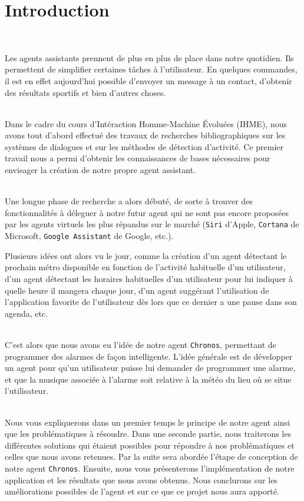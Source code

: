 \chapter*{Introduction}
\thispagestyle{plain}
~\\[1cm]
{ \large

Les agents assistants prennent de plus en plus de place dans notre quotidien.  Ils permettent de simplifier certaines tâches à l'utilisateur. En quelques  commandes, il est en effet aujourd'hui possible d'envoyer un message à un contact, d'obtenir des résultats sportifs et bien d'autres choses.

~\\\indent
Dans le cadre du cours d'\textsf{Intéraction Homme-Machine \'Evoluées} (\textsf{IHME}), nous avons tout d'abord effectué des travaux de recherches bibliographiques sur les systèmes de dialogues et sur les méthodes de détection d'activité. Ce premier  travail nous a permi d'obtenir les connaissances de bases nécessaires pour envisager la création de notre propre agent assistant.

~\\\indent
Une longue phase de recherche a alors débuté, de sorte à trouver des fonctionnalités à déleguer à notre futur agent qui ne sont pas encore proposées par les agents virtuels les plus répandus sur le marché (\og \texttt{Siri} \fg{} d'Apple, \og \texttt{Cortana} \fg{} de Microsoft, \og \texttt{Google Assistant} \fg{} de Google, etc.).

Plusieurs idées ont alors vu le jour, comme la création d'un agent détectant le prochain métro disponible en fonction de l'activité habituelle d'un utilisateur, d'un agent détectant les horaires habituelles d'un utilisateur pour lui indiquer à quelle heure il mangera chaque jour, d'un agent suggérant l'utilisation de l'application favorite de l'utilisateur dès lors que ce dernier a une pause dans son agenda, etc.

~\\\indent
C'est alors que nous avons eu l'idée de notre agent \texttt{Chronos}, permettant de programmer des alarmes de façon intelligente. L'idée générale est de développer un agent pour qu'un utilisateur puisse lui demander de programmer une alarme, et que la musique associée à l'alarme soit relative à la météo du lieu où se situe l'utilisateur.

~\\\indent
Nous vous expliquerons dans un premier temps le principe de notre agent ainsi que les problématiques à résoudre. Dans une seconde partie, nous traiterons les différentes solutions qui étaient possibles pour répondre à nos problématiques et celles que nous avons retenues. Par la suite sera abordée l'étape de conception de notre agent \texttt{Chronos}. Ensuite, nous vous présenterons l'implémentation de notre application et les résultats que nous avons obtenus. Nous conclurons sur les améliorations possibles de l'agent et sur ce que ce projet nous aura apporté.


}
